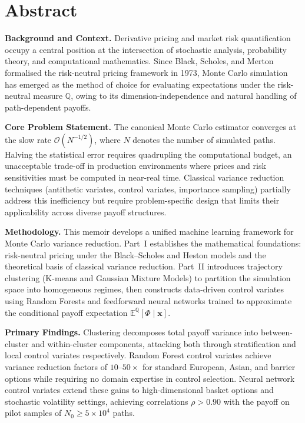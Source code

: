 \documentclass[12pt, a4paper]{report}
\theoremstyle{definition}
\begin{document}
\cleardoublepage

\chapter*{Abstract}
\thispagestyle{plain}

\noindent\textbf{Background and Context.}\enspace
Derivative pricing and market risk quantification occupy a central position
at the intersection of stochastic analysis, probability theory, and
computational mathematics.  Since Black, Scholes, and Merton formalised the
risk-neutral pricing framework in 1973, Monte Carlo simulation has emerged
as the method of choice for evaluating expectations under the risk-neutral
measure $\mathbb{Q}$, owing to its dimension-independence and natural
handling of path-dependent payoffs.

\medskip
\noindent\textbf{Core Problem Statement.}\enspace
The canonical Monte Carlo estimator converges at the slow rate
$\mathcal{O}(N^{-1/2})$, where $N$ denotes the number of simulated paths.
Halving the statistical error requires quadrupling the computational
budget, an unacceptable trade-off in production environments where prices
and risk sensitivities must be computed in near-real time.  Classical
variance reduction techniques (antithetic variates, control variates,
importance sampling) partially address this inefficiency but require
problem-specific design that limits their applicability across diverse
payoff structures.

\medskip
\noindent\textbf{Methodology.}\enspace
This memoir develops a unified machine learning framework for Monte Carlo
variance reduction.  Part~I establishes the mathematical foundations:
risk-neutral pricing under the Black--Scholes and Heston models and the
theoretical basis of classical variance reduction.  Part~II introduces
trajectory clustering (K-means and Gaussian Mixture Models) to partition
the simulation space into homogeneous regimes, then constructs data-driven
control variates using Random Forests and feedforward neural networks
trained to approximate the conditional payoff expectation
$\mathbb{E}^{\mathbb{Q}}[\Phi \mid \mathbf{x}]$.

\medskip
\noindent\textbf{Primary Findings.}\enspace
Clustering decomposes total payoff variance into between-cluster and
within-cluster components, attacking both through stratification and local
control variates respectively.  Random Forest control variates achieve
variance reduction factors of $10$--$50\times$ for standard European,
Asian, and barrier options while requiring no domain expertise in control
selection.  Neural network control variates extend these gains to
high-dimensional basket options and stochastic volatility settings,
achieving correlations $\rho > 0.90$ with the payoff on pilot samples of
$N_0 \geq 5 \times 10^4$ paths.
\end{document}
